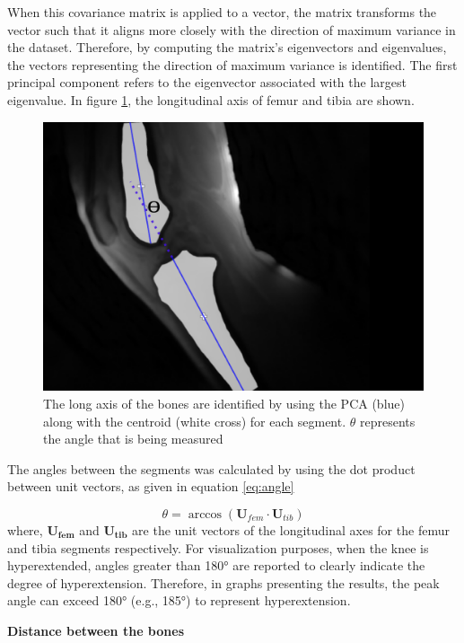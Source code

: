 \documentclass{micro-econ-thesis}
\begin{document}
When this covariance matrix is applied to a vector, the matrix transforms the vector such that it aligns more closely with the direction of maximum variance in the dataset. Therefore, by computing the matrix's eigenvectors and eigenvalues, the vectors representing the direction of maximum variance is identified. The first principal component refers to the eigenvector associated with the largest eigenvalue. In figure \ref{fig:longaxes}, the longitudinal axis of femur and tibia are shown. 

\begin{figure}[H]
	\centering
	\includegraphics[width=0.7\linewidth]{theta_angle}
	\caption{The long axis of the bones are identified by using the PCA (blue) along with the centroid (white cross) for each segment. $\theta$ represents the angle that is being measured}
	\label{fig:longaxes}
\end{figure}

The angles between the segments was calculated by using the dot product between unit vectors, as given in equation \ref{eq:angle}

\begin{equation}
	\theta = \arccos(\mathbf{U}_{fem} \cdot \mathbf{U}_{tib})
	\label{eq:angle}
\end{equation}
where, $\mathbf{U_{fem}}$ and $\mathbf{U_{tib}}$ are the unit vectors of the longitudinal axes for the femur and tibia segments respectively. For visualization purposes, when the knee is hyperextended, angles greater than 180° are reported to clearly indicate the degree of hyperextension. Therefore, in graphs presenting the results, the peak angle can exceed 180° (e.g., 185°) to represent hyperextension. 

\textbf{Distance between the bones}
\end{document}
